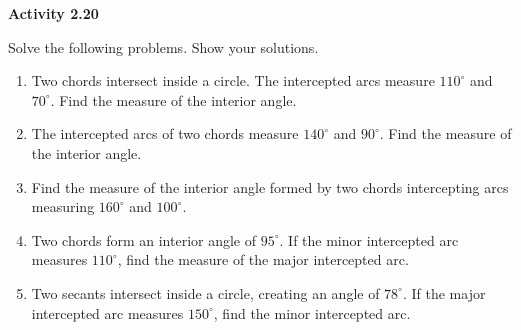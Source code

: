 \vspace{0.3ex}
\noindent\textbf{Activity 2.20}

\vspace{0.2ex}

Solve the following problems. Show your solutions.

\begin{enumerate}
    \item Two chords intersect inside a circle. The intercepted arcs measure $110^\circ$ and $70^\circ$. Find the measure of the interior angle.
    \item The intercepted arcs of two chords measure $140^\circ$ and $90^\circ$. Find the measure of the interior angle.
    \item Find the measure of the interior angle formed by two chords intercepting arcs measuring $160^\circ$ and $100^\circ$.
    \item Two chords form an interior angle of $95^\circ$. If the minor intercepted arc measures $110^\circ$, find the measure of the major intercepted arc.
    \item Two secants intersect inside a circle, creating an angle of $78^\circ$. If the major intercepted arc measures $150^\circ$, find the minor intercepted arc.
\end{enumerate}
